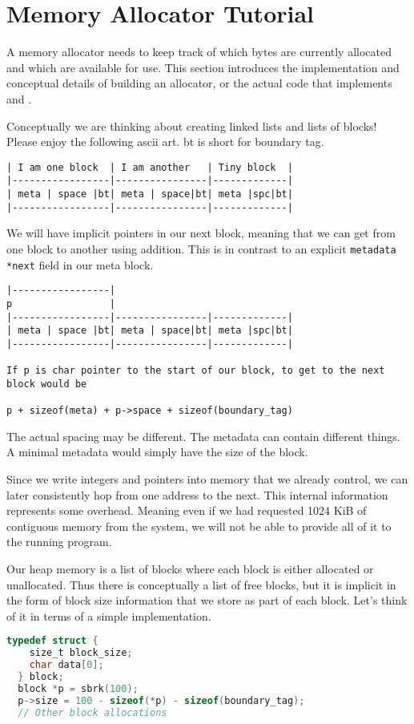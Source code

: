 \section{Memory Allocator Tutorial}

A memory allocator needs to keep track of which bytes are currently allocated and which are available for use.
This section introduces the implementation and conceptual details of building an allocator, or the actual code that implements  and .

Conceptually we are thinking about creating linked lists and lists of blocks!
Please enjoy the following ascii art.
bt is short for boundary tag.

\begin{verbatim}
| I am one block  | I am another   | Tiny block  |
|-----------------|----------------|-------------|
| meta | space |bt| meta | space|bt| meta |spc|bt|
|-----------------|----------------|-------------|
\end{verbatim}

We will have implicit pointers in our next block, meaning that we can get from one block to another using addition.
This is in contrast to an explicit \texttt{metadata *next} field in our meta block.

\begin{verbatim}
|-----------------|
p                 |
|-----------------|----------------|-------------|
| meta | space |bt| meta | space|bt| meta |spc|bt|
|-----------------|----------------|-------------|

If p is char pointer to the start of our block, to get to the next block would be

p + sizeof(meta) + p->space + sizeof(boundary_tag)
\end{verbatim}

The actual spacing may be different.
The metadata can contain different things.
A minimal metadata would simply have the size of the block.

Since we write integers and pointers into memory that we already control, we can later consistently hop from one address to the next.
This internal information represents some overhead.
Meaning even if we had requested 1024 KiB of contiguous memory from the system, we will not be able to provide all of it to the running program.

Our heap memory is a list of blocks where each block is either allocated or unallocated.
Thus there is conceptually a list of free blocks, but it is implicit in the form of block size information that we store as part of each block.
Let's think of it in terms of a simple implementation.
\begin{lstlisting}[language=C]
  typedef struct {
    size_t block_size;
    char data[0];
  } block;
  block *p = sbrk(100);
  p->size = 100 - sizeof(*p) - sizeof(boundary_tag);
  // Other block allocations
\end{lstlisting}

